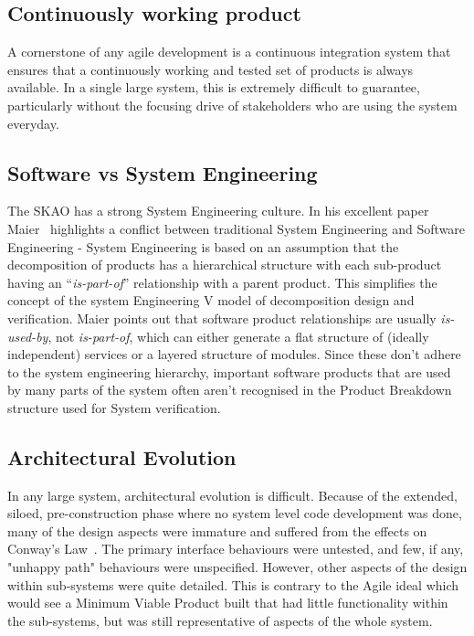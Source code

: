 \documentclass[a4paper,
               biblatex,     %
               keeplastbox,   %
               ]{jacow}
\begin{document}
\subsection{Continuously working product}
A cornerstone of any agile development is a continuous integration system that ensures that a continuously  working and tested set of products is always available. In a single large system, this is extremely difficult to guarantee, particularly without the focusing drive of stakeholders who are using the system everyday.

\subsection{Software vs System Engineering}
The SKAO has a strong System Engineering culture. In his excellent paper Maier~\cite{Maier2006} highlights a conflict between traditional System Engineering and Software Engineering - System Engineering is based on an assumption that the decomposition of products has a hierarchical structure with each sub-product having an ``{\em is-part-of}'' relationship with a parent product. This simplifies the concept of the system Engineering V model of decomposition design and verification. Maier points out that software product relationships are usually {\em is-used-by}, not {\em is-part-of}, which can either generate a flat structure of (ideally independent) services or a layered structure of modules. Since these don't adhere to the system engineering hierarchy, important software products that are used by many parts of the system often aren't recognised in the Product Breakdown structure used for System verification.

\subsection{Architectural Evolution}
In any large system, architectural evolution is difficult. Because of the extended, siloed, pre-construction phase where no system level code development was done, many of the design aspects were immature and suffered from the effects on Conway's Law~\cite{Conway}. The primary interface behaviours were untested, and few, if any, "unhappy path" behaviours were unspecified. However, other aspects of the design within sub-systems were quite detailed. This is contrary to the Agile ideal which would see a Minimum Viable Product built that had little functionality within the sub-systems, but was still representative of aspects of the whole system. 
\end{document}
